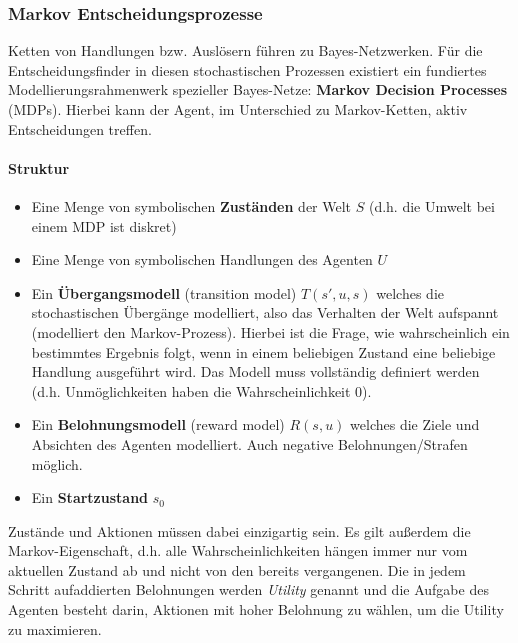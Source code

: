\subsubsection{Markov Entscheidungsprozesse}
Ketten von Handlungen bzw. Ausl\"osern f\"uhren zu Bayes-Netzwerken. F\"ur die Entscheidungsfinder in diesen stochastischen Prozessen existiert ein fundiertes Modellierungsrahmenwerk spezieller Bayes-Netze: \textbf{Markov Decision Processes} (MDPs). Hierbei kann der Agent, im Unterschied zu Markov-Ketten, aktiv Entscheidungen treffen.

\paragraph{Struktur}
\begin{itemize}
\item Eine Menge von symbolischen \textbf{Zust\"anden} der Welt $S$ (d.h. die Umwelt bei einem MDP ist diskret)
\item Eine Menge von symbolischen Handlungen des Agenten $U$
\item Ein \textbf{\"Ubergangsmodell} (transition model) $T(s', u, s)$ welches die stochastischen \"Uberg\"ange modelliert, also das Verhalten der Welt aufspannt (modelliert den Markov-Prozess). Hierbei ist die Frage, wie wahrscheinlich ein bestimmtes Ergebnis folgt, wenn in einem beliebigen Zustand eine beliebige Handlung ausgeführt wird. Das Modell muss vollständig definiert werden (d.h.     Unmöglichkeiten haben die Wahrscheinlichkeit 0).
\item Ein \textbf{Belohnungsmodell} (reward model) $R(s,u)$ welches die Ziele und Absichten des Agenten modelliert. Auch negative Belohnungen/Strafen möglich. 
\item Ein \textbf{Startzustand} $s_0$
\end{itemize}
Zust\"ande und Aktionen m\"ussen dabei einzigartig sein.
Es gilt au{\ss}erdem die Markov-Eigenschaft, d.h. alle Wahrscheinlichkeiten h\"angen immer nur vom aktuellen Zustand ab und nicht von den bereits vergangenen.
Die in jedem Schritt aufaddierten Belohnungen werden \emph{Utility} genannt und die Aufgabe des Agenten besteht darin, Aktionen mit hoher Belohnung zu w\"ahlen, um die Utility zu maximieren.

